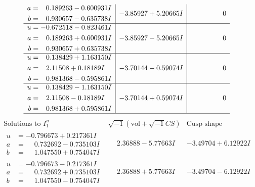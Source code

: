 \documentclass[1p]{elsarticle_modified}
\theoremstyle{definition}
\newcommand{\I}{\sqrt{-1}}
\begin{document}
$$\begin{array}{c|c|c}
\begin{aligned}
a &= \phantom{-}0.189263 - 0.600931 I \\
b &= \phantom{-}0.930657 - 0.635738 I\end{aligned}
 & -3.85927 + 5.20665 I & \phantom{-0.000000 } 0 \\ \hline\begin{aligned}
u &= -0.672518 - 0.823461 I \\
a &= \phantom{-}0.189263 + 0.600931 I \\
b &= \phantom{-}0.930657 + 0.635738 I\end{aligned}
 & -3.85927 - 5.20665 I & \phantom{-0.000000 } 0 \\ \hline\begin{aligned}
u &= \phantom{-}0.138429 + 1.163150 I \\
a &= \phantom{-}2.11508 + 0.18189 I \\
b &= \phantom{-}0.981368 - 0.595861 I\end{aligned}
 & -3.70144 - 0.59074 I & \phantom{-0.000000 } 0 \\ \hline\begin{aligned}
u &= \phantom{-}0.138429 - 1.163150 I \\
a &= \phantom{-}2.11508 - 0.18189 I \\
b &= \phantom{-}0.981368 + 0.595861 I\end{aligned}
 & -3.70144 + 0.59074 I & \phantom{-0.000000 } 0\\
 \hline 
 \end{array}$$\newpage$$\begin{array}{c|c|c}  
\text{Solutions to }I^u_{1}& \I (\text{vol} + \sqrt{-1}CS) & \text{Cusp shape}\\
 \hline 
\begin{aligned}
u &= -0.796673 + 0.217361 I \\
a &= \phantom{-}0.732692 - 0.735103 I \\
b &= \phantom{-}1.047550 + 0.754047 I\end{aligned}
 & \phantom{-}2.36888 - 5.77663 I & -3.49704 + 6.12922 I \\ \hline\begin{aligned}
u &= -0.796673 - 0.217361 I \\
a &= \phantom{-}0.732692 + 0.735103 I \\
b &= \phantom{-}1.047550 - 0.754047 I\end{aligned}
 & \phantom{-}2.36888 + 5.77663 I & -3.49704 - 6.12922 I \\ \hline\begin{aligned}

\end{aligned}
\end{array}$$
\end{document}
